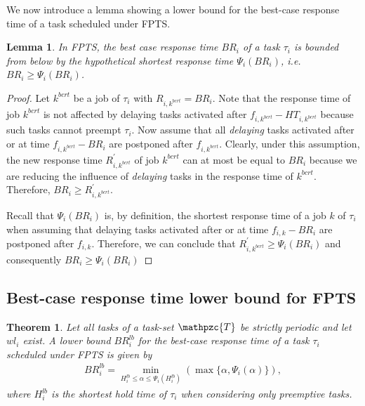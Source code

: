 \documentclass[fleqn]{article}
\newtheorem{theorem}{Theorem}
\newtheorem{lemma}{Lemma}
\begin{document}

We now introduce a lemma showing a lower bound for the best-case response time of a task scheduled under FPTS.

\begin{lemma} \label{lm:bcrt_lb}
	In FPTS, the \textit{best case response time} $BR_i$ of a task $\tau_i$ is bounded from below by the \textit{hypothetical shortest response time} $\Psi_i(BR_i)$, i.e. $BR_i \geq \Psi_i(BR_i)$.
\end{lemma}

\begin{proof}
	Let $k^{bcrt}$ be a job of $\tau_i$ with $R_{i,k^{bcrt}}=BR_i$. Note that the response time of job $k^{bcrt}$ is not affected by delaying tasks activated after $f_{i,k^{bcrt}} - HT_{i,k^{bcrt}}$ because such tasks cannot preempt $\tau_i$. Now assume that all \textit{delaying} tasks activated after or at time $f_{i,k^{bcrt}} - BR_i$ are postponed after $f_{i,k^{bcrt}}$. Clearly, under this assumption, the new response time $R^\prime_{i,k^{bcrt}}$ of job $k^{bcrt}$ can at most be equal to $BR_i$ because we are reducing the influence of \textit{delaying} tasks in the response time of $k^{bcrt}$. Therefore, $BR_i \geq R^\prime_{i,k^{bcrt}}$.
	
	Recall that $\Psi_i(BR_i)$ is, by definition, the shortest response time of a job $k$ of $\tau_i$ when assuming that delaying tasks activated after or at time $f_{i,k} - BR_i$ are postponed after $f_{i,k}$. Therefore, we can conclude that $R^\prime_{i,k^{bcrt}} \geq \Psi_i(BR_i)$ and consequently $BR_i \geq \Psi_i(BR_i)$
\end{proof}

\subsection{Best-case response time lower bound for FPTS}

\begin{theorem}\label{thm:bcrt_lb}
	Let all tasks of a task-set $\mathpzc{T}$ be strictly periodic and let $wl_i$ exist. A lower bound $BR^{lb}_i$ for the \textit{best-case response time} of a task $\tau_i$ scheduled under FPTS is given by
	\begin{align}
	BR^{lb}_i = \min \limits_{H_i^{lb} \leq \alpha \leq \Psi_i(H_i^{lb})} (\max \{ \alpha, \Psi_i(\alpha) \}),
	\end{align}
	where $H_i^{lb}$ is the shortest hold time of $\tau_i$ when considering only preemptive tasks.
\end{theorem}
\end{document}
